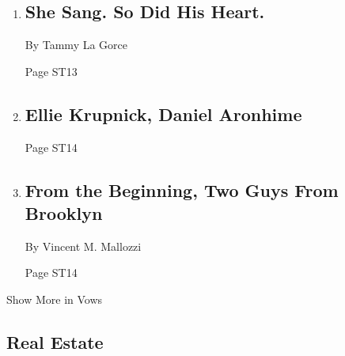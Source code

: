 \begin{enumerate}
\def\labelenumi{\arabic{enumi}.}
\item
  \href{/2019/11/29/fashion/weddings/Virginia-McEnerney-and-John-Schreiber-marry-in-Newark.html}{}

  \hypertarget{she-sang-so-did-his-heart}{%
  \subsection{She Sang. So Did His
  Heart.}\label{she-sang-so-did-his-heart}}

  By Tammy La Gorce

  Page ST13
\item
  \href{/2019/12/01/fashion/weddings/ellie-krupnick-daniel-aronhime.html}{}

  \hypertarget{ellie-krupnick-daniel-aronhime}{%
  \subsection{Ellie Krupnick, Daniel
  Aronhime}\label{ellie-krupnick-daniel-aronhime}}

  Page ST14
\item
  \href{/2019/11/30/fashion/weddings/from-the-beginning-two-guys-from-brooklyn.html}{}

  \hypertarget{from-the-beginning-two-guys-from-brooklyn}{%
  \subsection{From the Beginning, Two Guys From
  Brooklyn}\label{from-the-beginning-two-guys-from-brooklyn}}

  By Vincent M. Mallozzi

  Page ST14
\end{enumerate}

Show More in Vows

\hypertarget{real-estate}{%
\subsection{Real Estate}\label{real-estate}}

